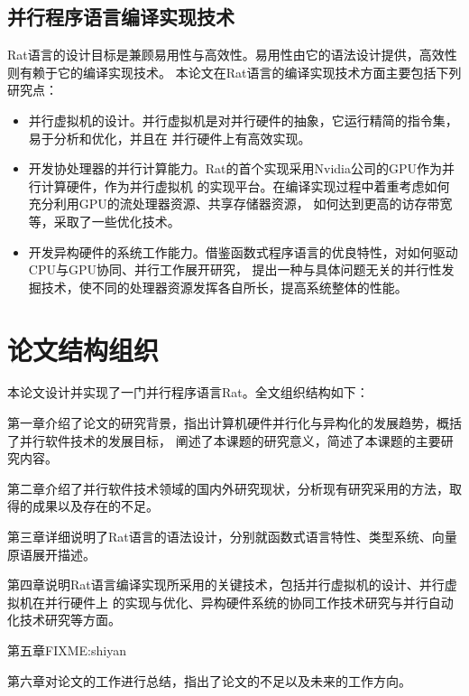 \subsection{并行程序语言编译实现技术}
Rat语言的设计目标是兼顾易用性与高效性。易用性由它的语法设计提供，高效性则有赖于它的编译实现技术。
本论文在Rat语言的编译实现技术方面主要包括下列研究点：
\begin{itemize}
  \item 并行虚拟机的设计。并行虚拟机是对并行硬件的抽象，它运行精简的指令集，易于分析和优化，并且在
    并行硬件上有高效实现。
  \item 开发协处理器的并行计算能力。Rat的首个实现采用Nvidia公司的GPU作为并行计算硬件，作为并行虚拟机
    的实现平台。在编译实现过程中着重考虑如何充分利用GPU的流处理器资源、共享存储器资源，
    如何达到更高的访存带宽等，采取了一些优化技术。
  \item 开发异构硬件的系统工作能力。借鉴函数式程序语言的优良特性，对如何驱动CPU与GPU协同、并行工作展开研究，
    提出一种与具体问题无关的并行性发掘技术，使不同的处理器资源发挥各自所长，提高系统整体的性能。
\end{itemize}

\section{论文结构组织}
本论文设计并实现了一门并行程序语言Rat。全文组织结构如下：

第一章介绍了论文的研究背景，指出计算机硬件并行化与异构化的发展趋势，概括了并行软件技术的发展目标，
阐述了本课题的研究意义，简述了本课题的主要研究内容。

第二章介绍了并行软件技术领域的国内外研究现状，分析现有研究采用的方法，取得的成果以及存在的不足。

第三章详细说明了Rat语言的语法设计，分别就函数式语言特性、类型系统、向量原语展开描述。

第四章说明Rat语言编译实现所采用的关键技术，包括并行虚拟机的设计、并行虚拟机在并行硬件上
的实现与优化、异构硬件系统的协同工作技术研究与并行自动化技术研究等方面。

第五章FIXME:shiyan

第六章对论文的工作进行总结，指出了论文的不足以及未来的工作方向。



